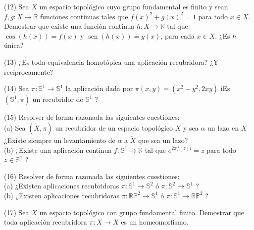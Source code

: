 \documentclass[
  a4paper,
  spanish,
  12pt,
]{scrartcl}
\begin{document}
\begin{ejer}
(12) Sea $X$ un espacio topológico cuyo grupo fundamental es finito y sean $f, g: X \rightarrow \mathbb{R}$ funciones continuas tales que $f(x)^{2}+g(x)^{2}=1$ para todo $x \in X$. Demostrar que existe una función continua $h: X \rightarrow \mathbb{R}$ tal que $\cos (h(x))=f(x)$ y $\operatorname{sen}(h(x))=g(x)$, para cada $x \in X$. ¿Es $h$ única?\\
\end{ejer}

\begin{ejer}
(13) ¿Es toda equivalencia homotópica una aplicación recubridora? ¿Y recíprocamente?\\
\end{ejer}

\begin{ejer}
(14) Sea $\pi: \mathbb{S}^{1} \rightarrow \mathbb{S}^{1}$ la aplicación dada por $\pi(x, y)=\left(x^{2}-y^{2}, 2 x y\right)$ iEs $\left(\mathbb{S}^{1}, \pi\right)$ un recubridor de $\mathbb{S}^{1}$ ?\\
\end{ejer}

\begin{ejer}
(15) Resolver de forma razonada las siguientes cuestiones:\\
(a) Sea $(\widetilde{X}, \pi)$ un recubridor de un espacio topológico $X$ y sea $\alpha$ un lazo en $X$ ¿Existe siempre un levantamiento de $\alpha$ a $\widetilde{X}$ que sea un lazo?\\
(b) ¿Existe una aplicación continua $f: \mathbb{S}^{1} \rightarrow \mathbb{R}$ tal que $e^{2 \pi f(z) i}=z$ para todo $z \in \mathbb{S}^{1}$ ?\\
\end{ejer}

\begin{ejer}
(16) Resolver de forma razonada las siguientes cuestiones:\\
(a) ¿Existen aplicaciones recubridoras $\pi: \mathbb{S}^{1} \rightarrow \mathbb{S}^{2}$ ó $\pi: \mathbb{S}^{2} \rightarrow \mathbb{S}^{1}$ ?\\
(b) ¿Existen aplicaciones recubridoras $\pi: \mathbb{R} \mathbb{P}^{2} \rightarrow \mathbb{S}^{1}$ ó $\pi: \mathbb{S}^{1} \rightarrow \mathbb{R} \mathbb{P}^{2}$ ?\\
\end{ejer}

\begin{ejer}
(17) Sea $X$ un espacio topológico con grupo fundamental finito. Demostrar que toda aplicación recubridora $\pi: X \rightarrow X$ es un homeomorfismo.\\
\end{ejer}
\end{document}
